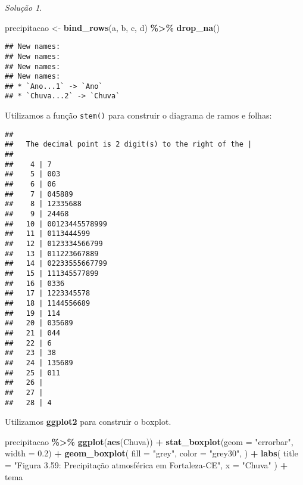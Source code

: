 \documentclass[
]{latex/krantz}
\newenvironment{Shaded}{\begin{snugshade}}{\end{snugshade}}
\newcommand{\AttributeTok}[1]{\textcolor[rgb]{0.13,0.29,0.53}{#1}}
\newcommand{\FloatTok}[1]{\textcolor[rgb]{0.00,0.00,0.81}{#1}}
\newcommand{\FunctionTok}[1]{\textcolor[rgb]{0.13,0.29,0.53}{\textbf{#1}}}
\newcommand{\NormalTok}[1]{#1}
\newcommand{\OtherTok}[1]{\textcolor[rgb]{0.56,0.35,0.01}{#1}}
\newcommand{\SpecialCharTok}[1]{\textcolor[rgb]{0.81,0.36,0.00}{\textbf{#1}}}
\newcommand{\StringTok}[1]{\textcolor[rgb]{0.31,0.60,0.02}{#1}}
\theoremstyle{definition}
\theoremstyle{definition}
\theoremstyle{definition}
\theoremstyle{definition}
\theoremstyle{remark}
\newtheorem*{solution}{Solução}
\begin{document}
\begin{solution}
\begin{Shaded}
\begin{Highlighting}[]
\NormalTok{precipitacao }\OtherTok{\textless{}{-}} \FunctionTok{bind\_rows}\NormalTok{(a, b, c, d) }\SpecialCharTok{\%\textgreater{}\%} \FunctionTok{drop\_na}\NormalTok{()}
\end{Highlighting}
\end{Shaded}

\begin{verbatim}
## New names:
## New names:
## New names:
## New names:
## * `Ano...1` -> `Ano`
## * `Chuva...2` -> `Chuva`
\end{verbatim}

Utilizamos a função \texttt{stem()} para construir o diagrama de ramos e folhas:

\begin{Shaded}
\end{Shaded}

\begin{verbatim}
## 
##   The decimal point is 2 digit(s) to the right of the |
## 
##    4 | 7
##    5 | 003
##    6 | 06
##    7 | 045889
##    8 | 12335688
##    9 | 24468
##   10 | 00123445578999
##   11 | 0113444599
##   12 | 0123334566799
##   13 | 011223667889
##   14 | 02233555667799
##   15 | 111345577899
##   16 | 0336
##   17 | 1223345578
##   18 | 1144556689
##   19 | 114
##   20 | 035689
##   21 | 044
##   22 | 6
##   23 | 38
##   24 | 135689
##   25 | 011
##   26 | 
##   27 | 
##   28 | 4
\end{verbatim}

Utilizamos \textbf{ggplot2} para construir o boxplot.

\begin{Shaded}
\begin{Highlighting}[]
\NormalTok{precipitacao }\SpecialCharTok{\%\textgreater{}\%}
  \FunctionTok{ggplot}\NormalTok{(}\FunctionTok{aes}\NormalTok{(Chuva)) }\SpecialCharTok{+}
    \FunctionTok{stat\_boxplot}\NormalTok{(}\AttributeTok{geom =} \StringTok{"errorbar"}\NormalTok{, }\AttributeTok{width =} \FloatTok{0.2}\NormalTok{) }\SpecialCharTok{+}
    \FunctionTok{geom\_boxplot}\NormalTok{(}
      \AttributeTok{fill =} \StringTok{"grey"}\NormalTok{, }
      \AttributeTok{color =} \StringTok{"grey30"}\NormalTok{,}
\NormalTok{    ) }\SpecialCharTok{+}
    \FunctionTok{labs}\NormalTok{(}
      \AttributeTok{title =} \StringTok{"Figura 3.59: Precipitação atmosférica em Fortaleza{-}CE"}\NormalTok{,}
      \AttributeTok{x =} \StringTok{"Chuva"}
\NormalTok{    ) }\SpecialCharTok{+}
\NormalTok{    tema}
\end{Highlighting}
\end{Shaded}


\end{solution}
\end{document}
